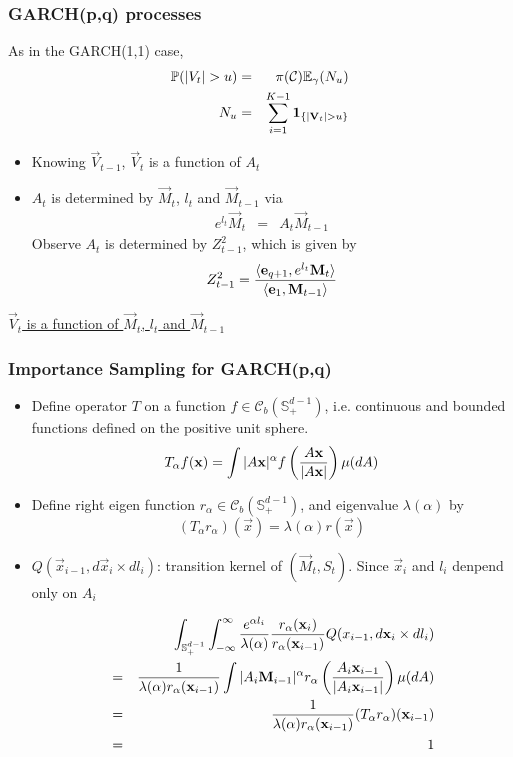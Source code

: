 \documentclass{beamer}
\begin{document}
\begin{frame}
  \frametitle{GARCH(p,q) processes}
  As in the GARCH(1,1) case,
  \begin{eqnarray*}
    \P(|V_t| > u) &=& \pi(\mathcal C) \E_\gamma(N_u) \\
    N_u &=& \sum_{i=1}^{K-1} \1{|\vec V_t| > u}
  \end{eqnarray*}
  \begin{itemize}
  \item Knowing $\vec V_{t-1}$, $\vec V_t$ is a function of $A_t$
  \item $A_t$ is determined by $\vec M_t$, $l_t$ and $\vec M_{t-1}$ via
    \begin{eqnarray*}
      e^{l_t} \vec M_t &=& A_t \vec M_{t-1}
    \end{eqnarray*}
    Observe $A_t$ is determined by $Z_{t-1}^2$, which is given by
    \[
    Z_{t-1}^2 = {
      \inn{\vec e_{q+1}, e^{l_t} \vec M_{t}}
      \over
      \inn{\vec e_{1}, \vec M_{t-1}}
    }
    \]
  \end{itemize}
  \underline{$\vec V_t$ is a function of $\vec M_t$, $l_t$ and $\vec M_{t-1}$}
\end{frame}

\begin{frame}
  \frametitle{Importance Sampling for GARCH(p,q)}
  \begin{itemize}
  \item Define operator $T$ on a function $f \in \mathscr C_b(\mathbb
    S^{d-1}_+)$, i.e. continuous and bounded functions defined on the
    positive unit sphere.
    \[
    T_\alpha f(\vec x) = \int |A \vec x|^\alpha
    f\left({A \vec x \over |A \vec x|}\right) \mu(dA)
    \]
  \item Define right eigen function $r_\alpha \in \mathscr C_b(\mathbb
    S^{d-1}_+)$, and eigenvalue $\lambda(\alpha)$ by
    \[
    (T_\alpha r_\alpha)(\vec x) = \lambda(\alpha) r(\vec x)
    \]
  \item $Q(\vec x_{i-1}, d\vec x_{i} \times dl_{i})$: transition kernel of
    $(\vec M_t, S_t)$. Since $\vec x_i$ and $l_i$ denpend only on
    $A_i$
    \begin{scriptsize}
      \begin{eqnarray*}
        && \int_{\mathbb S_+^{d-1}} \int_{-\infty}^\infty
        {e^{\alpha l_i} \over \lambda(\alpha)}
        {r_\alpha(\vec x_i) \over r_\alpha(\vec x_{i-1})}
        Q(x_{i-1}, d\vec x_{i} \times dl_{i}) \\
        &=&
        {1 \over \lambda(\alpha) r_\alpha(\vec x_{i-1})}
        \int |A_i \vec M_{i-1}|^\alpha
        r_\alpha\left(
          { A_i \vec x_{i-1}
            \over
            |A_i \vec x_{i-1}|
          }
        \right) \mu(dA) \\
        &=& 
        {1 \over \lambda(\alpha) r_\alpha(\vec x_{i-1})}
        (T_\alpha r_\alpha)(\vec x_{i-1}) \\
        &=& 1
      \end{eqnarray*}
    \end{scriptsize}
  \end{itemize}
\end{frame}
\end{document}
